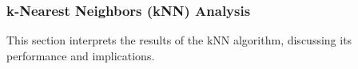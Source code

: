 \subsubsection{k-Nearest Neighbors (kNN) Analysis}
\label{subsubsec:discussion-knn}

This section interprets the results of the kNN algorithm, discussing its performance and implications.


